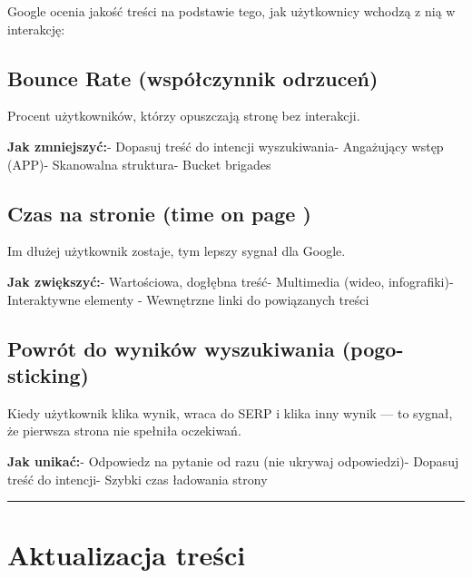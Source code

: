 \documentclass[
  12pt,
  a4paper,
  twoside,
  openright,
  12pt,
  DIV=12,
  BCOR=12mm]{scrbook}
\newcommand{\decoline}{%
  \begin{center}
    \textcolor{bordergray}{\rule{0.3\textwidth}{0.5pt}}
  \end{center}
}
\begin{document}
Google ocenia jakość treści na podstawie tego, jak użytkownicy wchodzą z
nią w interakcję:

\subsection{Bounce Rate (współczynnik
odrzuceń)}\label{bounce-rate-wspuxf3ux142czynnik-odrzuceux144}

Procent użytkowników, którzy opuszczają stronę bez interakcji.

\textbf{Jak zmniejszyć:}\newline - Dopasuj treść do intencji
wyszukiwania\newline - Angażujący wstęp (APP)\newline - Skanowalna
struktura\newline - Bucket brigades

\subsection{Czas na stronie (time on page
)}\label{czas-na-stronie-time-on-page}

Im dłużej użytkownik zostaje, tym lepszy sygnał dla Google.

\textbf{Jak zwiększyć:}\newline - Wartościowa, dogłębna treść\newline -
Multimedia (wideo, infografiki)\newline - Interaktywne elementy\newline
- Wewnętrzne linki do powiązanych treści

\subsection{Powrót do wyników wyszukiwania
(pogo-sticking)}\label{powruxf3t-do-wynikuxf3w-wyszukiwania-pogo-sticking}

Kiedy użytkownik klika wynik, wraca do SERP i klika inny wynik --- to
sygnał, że pierwsza strona nie spełniła oczekiwań.

\textbf{Jak unikać:}\newline - Odpowiedz na pytanie od razu (nie ukrywaj
odpowiedzi)\newline - Dopasuj treść do intencji\newline - Szybki czas
ładowania strony

\decoline

\section{Aktualizacja treści}\label{aktualizacja-treux15bci}
\end{document}
